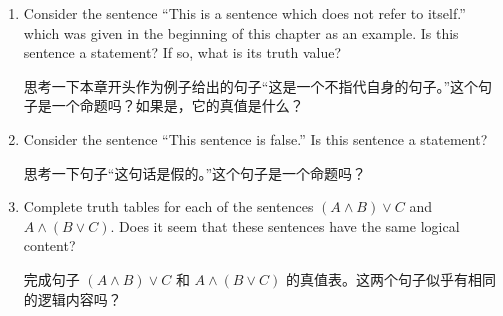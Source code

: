 \begin{enumerate}
{    \vfill
    
    }
    
    \workbookpagebreak
    
    \item Consider the sentence 
    ``This is a sentence which does not refer to itself.''
    which was given in the beginning of this chapter as an example.
    Is this sentence a statement?  If so, what is its truth value?
    
    思考一下本章开头作为例子给出的句子“这是一个不指代自身的句子。”这个句子是一个命题吗？如果是，它的真值是什么？
    
    \vfill
    
    \item Consider the sentence ``This sentence is false.''  Is this 
    sentence a statement?
    
    思考一下句子“这句话是假的。”这个句子是一个命题吗？
    
    \hintspagebreak
    
    \vfill
    
    \workbookpagebreak
    
    \item Complete truth tables for each of the sentences 
    $(A \land B) \lor C$ and
    $A \land (B \lor C)$.
    Does it seem that these sentences have
    the same logical content?
    
    完成句子 $(A \land B) \lor C$ 和 $A \land (B \lor C)$ 的真值表。这两个句子似乎有相同的逻辑内容吗？
\end{enumerate}
